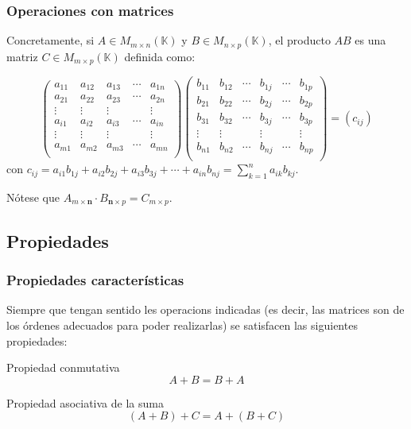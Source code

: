 \documentclass[aspectratio=169]{beamer}
\begin{document}
   \begin{frame}
  \frametitle{Operaciones con matrices}
 Concretamente, si $A \in M_{m\times n}(\mathbb{K})$ y $B \in M_{n\times p}(\mathbb{K})$, el producto $AB$ es una matriz $C \in M_{m\times p}(\mathbb{K})$ definida como:

\[  \left( \begin{matrix} %
      a_{11} & a_{12} & a_{13} & \cdots & a_{1n} \\
      a_{21} & a_{22} & a_{23} & \cdots & a_{2n} \\
      \vdots & \vdots & \vdots &   & \vdots \\
      a_{i1} & a_{i2} & a_{i3} & \cdots & a_{in} \\
      \vdots & \vdots & \vdots &   & \vdots \\
      a_{m1} & a_{m2} & a_{m3} & \cdots & a_{mn} \\
   \end{matrix}
   \right)  
   \left( \begin{matrix} %
      b_{11} & b_{12} & \cdots & b_{1j} & \cdots & b_{1p} \\
      b_{21} & b_{22} & \cdots & b_{2j} & \cdots & b_{2p} \\
       b_{31} & b_{32} & \cdots & b_{3j} & \cdots & b_{3p} \\
      \vdots & \vdots & & \vdots &   & \vdots \\
      b_{n1} & b_{n2} & \cdots & b_{nj} & \cdots & b_{np} \\
   \end{matrix}
   \right) = (c_{ij})\]
   con $c_{ij} = a_{i1}b_{1j} + a_{i2}b_{2j}+a_{i3}b_{3j}+\cdots+a_{in}b_{nj} = \sum_{k=1}^n a_{ik}b_{kj}$.
   
   N\'otese que $A_{m\times \boldsymbol{n}}\cdot B_{\boldsymbol{n}\times p} = C_{m\times p}$. 
 \end{frame}
 
 
 \subsection{Propiedades}

  \begin{frame}
  \frametitle{Propiedades caracter\'isticas}
  
  Siempre que tengan sentido les operacions indicadas (es decir, las matrices son de los \'ordenes adecuados para poder realizarlas) se satisfacen las siguientes propiedades:
   \begin{block}{Propiedad conmutativa}
   \[A+B = B+A\]
  \end{block}
  
  
     \begin{block}{Propiedad asociativa de la suma}
   \[(A+B)+C= A+(B+C)\]
  \end{block}
  
  
 \end{frame}
 
\end{document}
